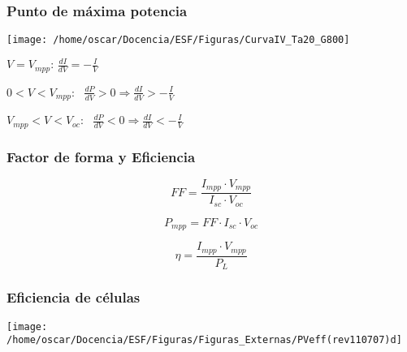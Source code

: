 \documentclass[xcolor=dvipsnames]{beamer}
\begin{document}
\begin{frame}[plain]
  \frametitle{Punto de máxima potencia}

  \begin{center}
    \texttt{[image: /home/oscar/Docencia/ESF/Figuras/CurvaIV\_Ta20\_G800]}
    \par\end{center}
  \begin{block} {}

\begin{center}
  $V=V_{mpp}:\,\frac{dI}{dV}=-\frac{I}{V}$
  \par\end{center}

\begin{center}
  $0<V<V_{mpp}$:
  ~$\frac{dP}{dV}>0\Rightarrow\frac{dI}{dV}>-\frac{I}{V}$
  \par\end{center}

\begin{center}
  $V_{mpp}<V<V_{oc}$:~
  $\frac{dP}{dV}<0\Rightarrow\frac{dI}{dV}<-\frac{I}{V}$
  \par\end{center}

\end{block}

\end{frame}

\begin{frame}
  \frametitle{Factor de forma y Eficiencia}

\[
FF=\frac{I_{mpp}\cdot V_{mpp}}{I_{sc}\cdot V_{oc}}\]


\[
P_{mpp}=FF\cdot I_{sc}\cdot V_{oc}\]


\[
\eta=\frac{I_{mpp}\cdot V_{mpp}}{P_{L}}\]



\end{frame}

\begin{frame}[plain]
  \frametitle{Eficiencia de células}

  \begin{center}
    \texttt{[image: /home/oscar/Docencia/ESF/Figuras/Figuras\_Externas/PVeff(rev110707)d]}
    \par\end{center}


\end{frame}
\end{document}
